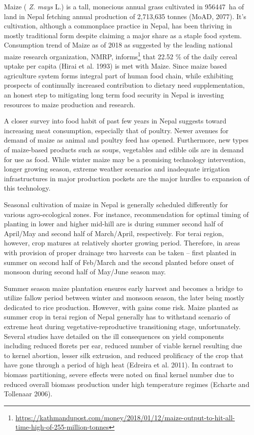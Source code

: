 \documentclass[
]{article}
\begin{document}
Maize ( \emph{Z. mays} L.) is a tall, monecious annual grass cultivated in \SI{956447}{\hectare} of land in Nepal fetching annual production of 2,713,635 tonnes (MoAD, 2077). It's cultivation, although a commonplace practice in Nepal, has been thriving in mostly traditional form despite claiming a major share as a staple food system. Consumption trend of Maize as of 2018 as suggested by the leading national maize research organization, NMRP, informs\footnote{\url{https://kathmandupost.com/money/2018/01/12/maize-output-to-hit-all-time-high-of-255-million-tonnes}} that 22.52 \% of the daily cereal uptake per capita (Hirai et al. 1993) is met with Maize. Since maize based agriculture system forms integral part of human food chain, while exhibiting prospects of continually increased contribution to dietary need supplementation, an honest step to mitigating long term food security in Nepal is investing resources to maize production and research.

A closer survey into food habit of past few years in Nepal suggests toward increasing meat consumption, especially that of poultry. Newer avenues for demand of maize as animal and poultry feed has opened. Furthermore, new types of maize-based products such as soups, vegetables and edible oils are in demand for use as food. While winter maize may be a promising technology intervention, longer growing season, extreme weather scenarios and inadequate irrigation infrastructures in major production pockets are the major hurdles to expansion of this technology.

Seasonal cultivation of maize in Nepal is generally scheduled differently for various agro-ecological zones. For instance, recommendation for optimal timing of planting in lower and higher mid-hill are is during summer second half of April/May and second half of March/April, respectively. For terai region, however, crop matures at relatively shorter growing period. Therefore, in areas with provision of proper drainage two harvests can be taken -- first planted in summer on second half of Feb/March and the second planted before onset of monsoon during second half of May/June season may.

Summer season maize plantation ensures early harvest and becomes a bridge to utilize fallow period between winter and monsoon season, the later being mostly dedicated to rice production. However, with gains come risk. Maize planted as summer crop in terai region of Nepal generally has to withstand scenario of extreme heat during vegetative-reproductive transitioning stage, unfortunately. Several studies have detailed on the ill consequences on yield components including reduced florets per ear, reduced number of viable kernel resulting due to kernel abortion, lesser silk extrusion, and reduced prolificacy of the crop that have gone through a period of high heat (Edreira et al. 2011). In contrast to biomass partitioning, severe effects were noted on final kernel number due to reduced overall biomass production under high temperature regimes (Echarte and Tollenaar 2006).
\end{document}
